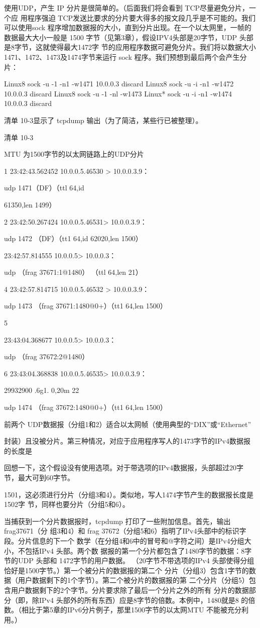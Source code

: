 使用UDP，产生 IP 分片是很简单的。（后面我们将会看到 TCP尽量避免分片，一个应
用程序强迫 TCP发送比要求的分片要大得多的报文段几乎是不可能的。我们可以使用sock
程序增加数据报的大小，直到分片出现。在一个以太网里，一帧的数据最大大小一般是 1500
字节（见第3章），假设IPV4头部是20字节，UDP 头部是8字节，这就使得最大1472字
节的应用程序数据可避免分片。我们将以数据大小 1471、1472、1473及1474字节来运行
sock 程序。我们预想到最后两个会产生分片：

Linux8 sock -u -1 -n1 -w1471 10.0.0.3 discard
Linux8 sock -u -i -n1 -w1472 10.0.0.3 discard
Linux8 sock -u -1 -nl -w1473
Linux* sock -u -i -n1 -w1474 10.0.0.3 discard

清单 10-3显示了 tcpdump 输出（为了简洁，某些行已被整理）。

清单 10-3

MTU 为1500字节的以太网链路上的UDP分片

1 23:42:43.562452 10.0.0.5.46530 > 10.0.0.3.9：

udp 1471（DF）（ttl 64,id

61350,len 1499）

2 23:42:50.267424 10.0.0.5.46531> 10.0.0.3.9：

udp 1472 （DF）（tt1 64,id 62020,len 1500）

23:42:57.814555 10.0.0.5> 10.0.0.3：

udp （frag 37671:1@1480） （ttl 64,len 21）

4 23:42:57.814715 10.0.0.5.46532 > 10.0.0.3.9：

udp 1473 （frag 37671:1480@0+）（tt1 64,len 1500）

5

23:43:04.368677 10.0.0.5> 10.0.0.3：

udp （frag 37672:2@1480）

6 23:43:04.368838 10.0.0.5.46535> 10.0.0.3.9：

29932900 .6g1. 0,20m 22

udp 1474 （frag 37672:1480@0+）（tt1 64,len 1500）

前两个 UDP数据报（分组1和2）适合以太网帧（使用典型的“DIX”或“Ethernet”

封装）且没被分片。第三种情况，对应于应用程序写人的1473字节的IPv4数据报的长度是


回想一下，这个假设没有使用选项。对于带选项的IPv4数据报，头部超过20字节，最大可到60字节。

1501，这必须进行分片（分组3和4）。类似地，写人1474字节产生的数据报长度是1502字
节，同样也要分片（分组5和6）。

当捕获到一个分片数据报时，tcpdump 打印了一些附加信息。首先，输出 frag37671（分
组3和4）和 frag 37672（分组5和6）指明了IPv4头部中的标识字段。分片信息的下一个
数学（在分组4和6中的冒号和@字符之间）是IPv4分组大小，不包括IPv4 头部。两个数
据报的第一个分片都包含了1480字节的数据：8字节的UDP 头部和 1472字节的用户数据。
（20字节不带选项的IPv4 头部使得分组恰好是1500字节。）第一个被分片的数据报的第二个
分片（分组3）包含1字节的数据（用户数据剩下的1个字节）。第二个被分片的数据报的第
二个分片（分组5）包含用户数据剩下的2个字节。分片要求除了最后一个分片之外的所有
分片的数据部分（即，除IPv4 头部外的所有东西）应是8字节的倍数。本例中，1480就是8
的倍数。（相比于第5章的IPv6分片例子，那里1500字节的以太网MTU 不能被充分利用。）

